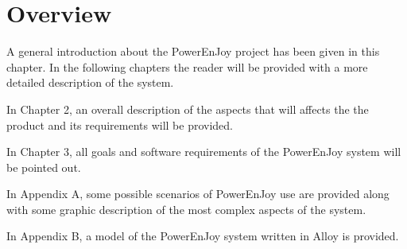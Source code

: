 \section{Overview}

A general introduction about the PowerEnJoy project has been given in this chapter. In the following chapters the reader will be provided with a more detailed description of the system.

In Chapter 2, an overall description of the aspects that will affects the the product and its requirements will be provided.

In Chapter 3, all goals and software requirements of the PowerEnJoy system will be pointed out.

In Appendix A, some possible scenarios of PowerEnJoy use are provided along with some graphic description of the most complex aspects of the system.

In Appendix B, a model of the PowerEnJoy system written in Alloy \cite{alloy} is provided. 